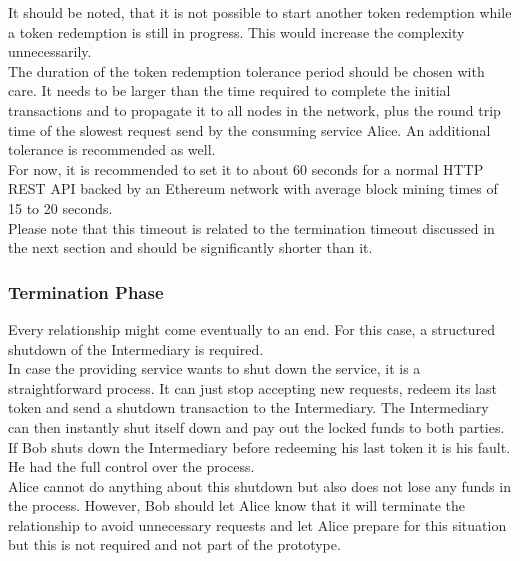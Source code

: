 \documentclass[a4paper,12pt]{scrartcl}
\begin{document}
It should be noted, that it is not possible to start another token redemption while a token redemption is still in progress. This would increase the complexity unnecessarily.\\

The duration of the token redemption tolerance period should be chosen with care. It needs to be larger than the time required to complete the initial transactions and to propagate it to all nodes in the network, plus the round trip time of the slowest request send by the consuming service Alice. An additional tolerance is recommended as well.\\
For now, it is recommended to set it to about 60 seconds for a normal HTTP REST API backed by an Ethereum network with average block mining times of 15 to 20 seconds.\\
Please note that this timeout is related to the termination timeout discussed in the next section and should be significantly shorter than it.

\subsubsection{Termination Phase}

Every relationship might come eventually to an end. For this case, a structured shutdown of the Intermediary is required.\\

In case the providing service wants to shut down the service, it is a straightforward process. It can just stop accepting new requests, redeem its last token and send a shutdown transaction to the Intermediary. The Intermediary can then instantly shut itself down and pay out the locked funds to both parties.\\
If Bob shuts down the Intermediary before redeeming his last token it is his fault. He had the full control over the process.\\
Alice cannot do anything about this shutdown but also does not lose any funds in the process. However, Bob should let Alice know that it will terminate the relationship to avoid unnecessary requests and let Alice prepare for this situation but this is not required and not part of the prototype.\\
\end{document}
